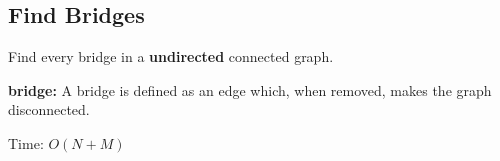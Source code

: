 \subsection{Find Bridges}

Find every bridge in a \textbf{undirected} connected graph.

\textbf{bridge: }  A bridge is defined as an edge which, when removed, makes the graph disconnected.


Time: $O(N+M)$
